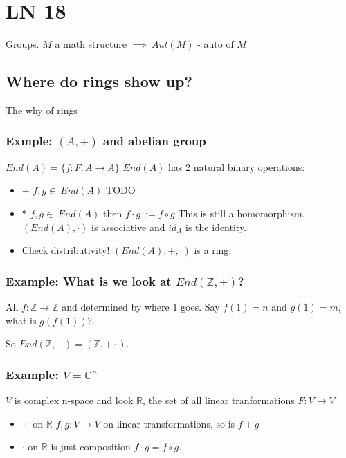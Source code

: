 \documentclass[11pt]{article}
\author{Fanping}
\date{\today}
\title{}
\begin{document}
\tableofcontents

\section{LN 18}
\label{sec:org1e5cb7a}
Groups. \(M\) a math structure \(\implies\ Aut(M)\) - auto of \(M\)
\subsection{Where do rings show up?}
\label{sec:orga7996c3}
The why of rings
\subsubsection{Exmple: \((A, +)\) and abelian group}
\label{sec:org0c95ee7}
\(End(A) = \{f : F : A \to A \}\)
\(End(A)\) has 2 natural binary operations:
\begin{itemize}
\item \(+\)
\(f, g \in\ End(A)\) TODO
\item \(*\)
\(f, g \in\ End(A)\) then \(f \cdot g\ := f \circ g\)
This is still a homomorphism. \((End(A), \cdot)\) is associative and \(id_A\)
is the identity.
\item Check distributivity!
\((End(A), +, \cdot)\) is a ring.
\end{itemize}

\subsubsection{Example: What is we look at \(End(\mathbb{Z}, +)\)?}
\label{sec:org4de7b1a}
All \(f : \mathbb{Z} \to \mathbb{Z}\) and determined by where \(1\) goes.
Say \(f(1) = n\) and \(g(1) = m\), what is \(g(f(1))\)?

So \(End(\mathbb{Z}, +) = (\mathbb{Z}, + \cdot)\).

\subsubsection{Example: \(V = \mathbb{C}^n\)}
\label{sec:org1731a31}
\(V\) is complex n-space and look \(\mathbb{R}\), the set of all linear
tranformations \(F: V \to V\)
\begin{itemize}
\item \(+\) on \(\mathbb{R}\)
\(f, g : V \to V\) on linear transformations, so is \(f + g\)
\item \(\cdot\) on \(\mathbb{R}\)
is just composition \(f \cdot g = f \circ g\).
\end{itemize}
\end{document}
